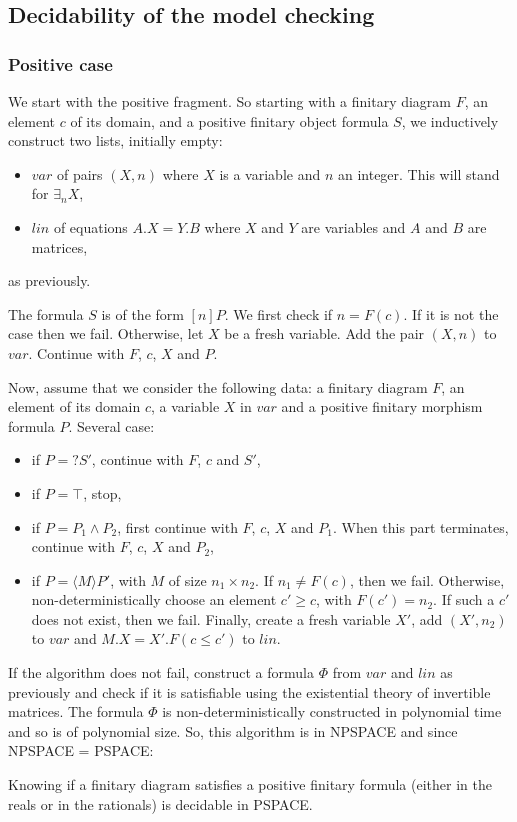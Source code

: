 \subsection{Decidability of the model checking}

\subsubsection{Positive case}

We start with the positive fragment. So starting with a finitary diagram $F$, an element $c$ of its domain, and a positive finitary object formula $S$, we inductively construct two lists, initially empty:
\begin{itemize}
	\item $var$ of pairs $(X,n)$ where $X$ is a variable and $n$ an integer. This will stand for $\exists_n X$,
	\item $lin$ of equations $A.X=Y.B$ where $X$ and $Y$ are variables and $A$ and $B$ are matrices,
\end{itemize}
as previously.

The formula $S$ is of the form $[n]P$. We first check if $n = F(c)$. If it is not the case then we fail. Otherwise, let $X$ be a fresh variable. Add the pair $(X,n)$ to $var$. Continue with $F$, $c$, $X$ and $P$.

Now, assume that we consider the following data: a finitary diagram $F$, an element of its domain $c$, a variable $X$ in $var$ and a positive finitary morphism formula $P$. Several case:
\begin{itemize}
	\item if $P = ?S'$, continue with $F$, $c$ and $S'$,
	\item if $P = \top$, stop,
	\item if $P = P_1\wedge P_2$, first continue with $F$, $c$, $X$ and $P_1$. When this part terminates, continue with $F$, $c$, $X$ and $P_2$,
	\item if $P = \langle M \rangle P'$, with $M$ of size $n_1\times n_2$. If $n_1 \neq F(c)$, then we fail. Otherwise, non-deterministically choose an element $c' \geq c$, with $F(c') = n_2$. If such a $c'$ does not exist, then we fail. Finally, create a fresh variable $X'$, add $(X',n_2)$ to $var$ and $M.X = X'.F(c\leq c')$ to $lin$.
\end{itemize}

If the algorithm does not fail, construct a formula $\Phi$ from $var$ and $lin$ as previously and check if it is satisfiable using the existential theory of invertible matrices. The formula $\Phi$ is non-deterministically constructed in polynomial time and so is of polynomial size. So, this algorithm is in NPSPACE and since NPSPACE = PSPACE:
\begin{theo}
Knowing if a finitary diagram satisfies a positive finitary formula (either in the reals or in the rationals) is decidable in PSPACE.
\end{theo}

